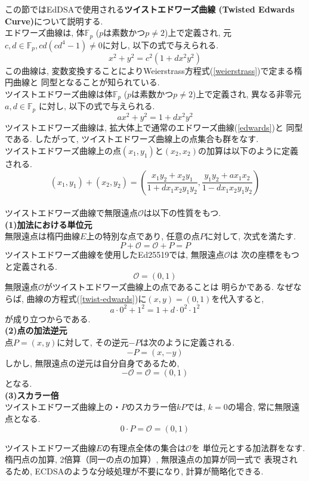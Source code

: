 この節ではEdDSAで使用される\textbf{ツイストエドワーズ曲線
(Twisted Edwards Curve)}について説明する.\\
\indent エドワーズ曲線は, 体$\mathbb{F}_p$ ($p$は素数かつ$p\neq 2$)上で定義され, 
元$c,d\in \mathbb{F}_p, cd(cd^{4}-1)\neq 0$に対し, 
以下の式で与えられる.
\begin{equation}\label{edwards}
  x^2 + y^2 = c^2(1+dx^2y^2)
\end{equation}
この曲線は, 変数変換することによりWeierstrass方程式(\ref{weierstrass})で定まる楕円曲線と
同型となることが知られている\cite{edwarscurve-to-ellipticcurve}.\\
\indent ツイストエドワーズ曲線は体$\mathbb{F}_p$ ($p$は素数かつ$p\neq 2$)上で定義され, 
異なる非零元$a,d\in \mathbb{F}_p$ に対し, 以下の式で与えられる.
\begin{equation}\label{twist-edwards}
  ax^2 + y^2 = 1 + dx^2y^2
\end{equation}
ツイストエドワーズ曲線は, 拡大体上で通常のエドワーズ曲線(\ref{edwards})と
同型である. したがって, %
ツイストエドワーズ曲線上の点集合も群をなす\cite{twisted}.\\
\indent ツイストエドワーズ曲線上の点$(x_1,y_1)$と$(x_2,x_2)$の加算は以下のように定義される.
\[
  (x_1,y_1)+(x_2,y_2)=
  \left( 
    \frac{x_1y_2+x_2y_1}{1+dx_1x_2y_1y_2},
    \frac{y_1y_2+ax_1x_2}{1-dx_1x_2y_1y_2} 
  \right)
\] \\[1em]

\indent ツイストエドワーズ曲線で無限遠点$\mathcal{O}$は以下の性質をもつ.\\[0.5em]
\noindent\textbf{(1)加法における単位元}\\
\indent 無限遠点は楕円曲線$E$上の特別な点であり, 任意の点$P$に対して, 次式を満たす.
\[
  P+\mathcal{O}=\mathcal{O}+P=P
\]
\indent ツイストエドワーズ曲線を使用したEd25519では, 無限遠点$\mathcal{O}$は
次の座標をもつと定義される.
\[
  \mathcal{O}=(0,1)
\]
\indent 無限遠点$\mathcal{O}$がツイストエドワーズ曲線上の点であることは
明らかである. なぜならば, 曲線の方程式(\ref{twist-edwards})に$(x,y)=(0,1)$を代入すると,
\[
  a\cdot 0^2 + 1^2 = 1 + d\cdot 0^{2}\cdot 1^2
\]
が成り立つからである.\\[0.5em]
\noindent \textbf{(2)点の加法逆元}\\
\indent 点$P=(x,y)$に対して, その逆元$-P$は次のように定義される.
\[
  -P=(x,-y)
\]
\indent しかし, 無限遠点の逆元は自分自身であるため, 
\[
  -\mathcal{O}=\mathcal{O}=(0,1)
\]
となる.\\[0.5em]
\noindent \textbf{(3)スカラー倍}\\
\indent ツイストエドワーズ曲線上の・$P$のスカラー倍$kP$では, 
$k=0$の場合, 常に無限遠点となる.
\[
  0\cdot P=\mathcal{O}=(0,1)
\]

\indent ツイストエドワーズ曲線$E$の有理点全体の集合は$\mathcal{O}$を
単位元とする加法群をなす.\\
\indent 楕円点の加算, 2倍算（同一の点の加算）, 無限遠点の加算が同一式で
表現されるため, ECDSAのような分岐処理が不要になり, 計算が簡略化できる.\\



